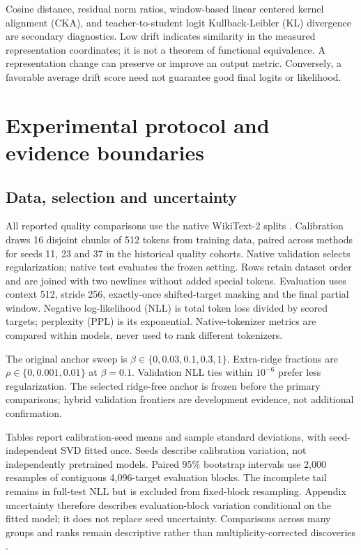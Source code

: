\documentclass[10pt]{article}
\begin{document}
Cosine distance, residual norm ratios, window-based linear centered kernel alignment (CKA), and teacher-to-student logit Kullback-Leibler (KL) divergence are secondary diagnostics. Low drift indicates similarity in the measured representation coordinates; it is not a theorem of functional equivalence. A representation change can preserve or improve an output metric. Conversely, a favorable average drift score need not guarantee good final logits or likelihood.

\section{Experimental protocol and evidence boundaries}

\subsection{Data, selection and uncertainty}

All reported quality comparisons use the native WikiText-2 splits \cite{merity2016wikitext}. Calibration draws 16 disjoint chunks of 512 tokens from training data, paired across methods for seeds 11, 23 and 37 in the historical quality cohorts. Native validation selects regularization; native test evaluates the frozen setting. Rows retain dataset order and are joined with two newlines without added special tokens. Evaluation uses context 512, stride 256, exactly-once shifted-target masking and the final partial window. Negative log-likelihood (NLL) is total token loss divided by scored targets; perplexity (PPL) is its exponential. Native-tokenizer metrics are compared within models, never used to rank different tokenizers.

The original anchor sweep is $\beta\in\{0,0.03,0.1,0.3,1\}$. Extra-ridge fractions are $\rho\in\{0,0.001,0.01\}$ at $\beta=0.1$. Validation NLL ties within $10^{-6}$ prefer less regularization. The selected ridge-free anchor is frozen before the primary comparisons; hybrid validation frontiers are development evidence, not additional confirmation.

Tables report calibration-seed means and sample standard deviations, with seed-independent SVD fitted once. Seeds describe calibration variation, not independently pretrained models. Paired 95\% bootstrap intervals use 2,000 resamples of contiguous 4,096-target evaluation blocks. The incomplete tail remains in full-test NLL but is excluded from fixed-block resampling. Appendix uncertainty therefore describes evaluation-block variation conditional on the fitted model; it does not replace seed uncertainty. Comparisons across many groups and ranks remain descriptive rather than multiplicity-corrected discoveries \cite{biderman2024evaluation}.
\end{document}
